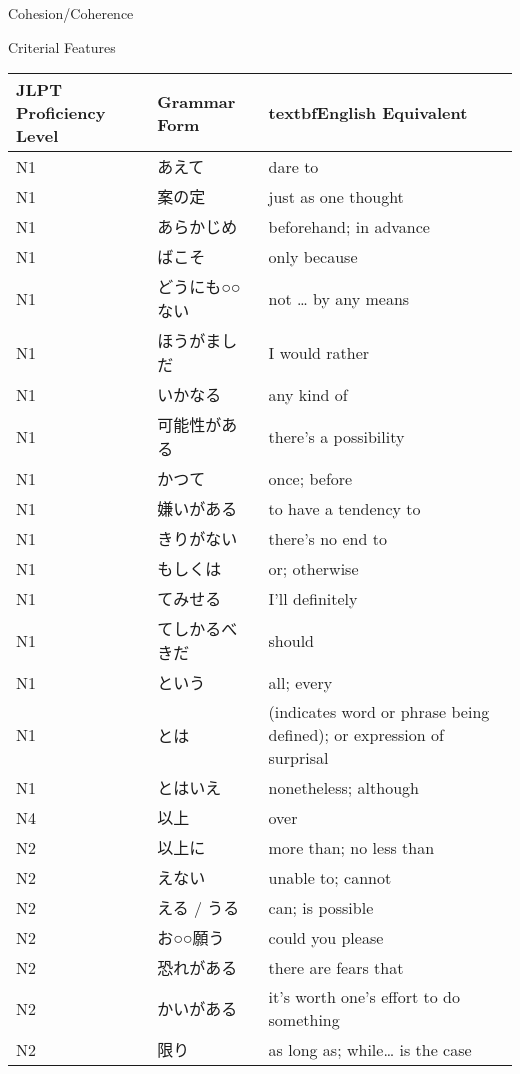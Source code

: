Cohesion/Coherence
\begin{itemize}
\end{itemize}


Criterial Features
\begin{table}[h!]
\centering
\begin{tabular}{lll}
\hline \textbf{JLPT Proficiency Level} & \textbf{Grammar Form} & textbf{English Equivalent}  \\ \hline

N1  &	あえて &	        dare to \\
N1  &	案の定 &	        just as one thought\\
N1  &	あらかじめ   &	beforehand; in advance\\
N1  &	ばこそ &	        only because\\
N1  &	どうにも○○ない    &	not … by any means\\
N1  &	ほうがましだ  &	I would rather\\
N1  &	いかなる	&       any kind of\\
N1	&   可能性がある  &	there's a possibility\\
N1	&   かつて	&       once; before\\
N1	&   嫌いがある &     	to have a tendency to\\
N1	&   きりがない	&   there's no end to\\
N1	&   もしくは	    &   or; otherwise\\
N1	&   てみせる	    &   I'll definitely\\
N1	&   てしかるべきだ & 	should\\
N1	&   という     &   	all; every\\
N1	&   とは	    &       (indicates word or phrase being defined); or expression of surprisal\\
N1  &	とはいえ	&       nonetheless; although\\
N4	&   以上  	&       over\\
N2	&   以上に	&       more than; no less than\\
N2	&   えない    &     	unable to; cannot\\
N2	&   える / うる &	can; is possible\\
N2	&   お○○願う &     	could you please\\
N2	&   恐れがある &     	there are fears that\\
N2	&   かいがある &     	it's worth one's effort to do something\\
N2	&   限り	        &   as long as; while… is the case\\

\end{tabular}
\end{table}
